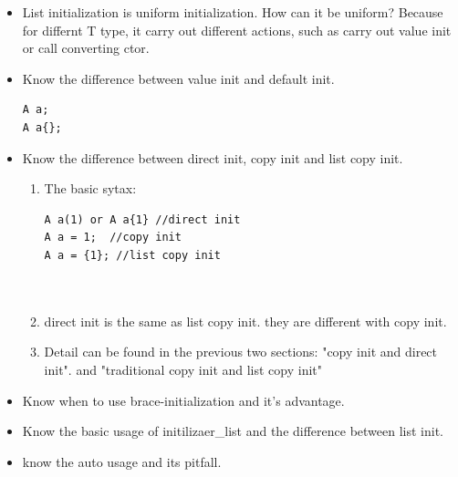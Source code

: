 \documentclass[a4paper,11pt,twoside]{book}
\begin{document}
\begin{itemize}
	\item List initialization is uniform initialization. How can it be uniform? Because for differnt T type, it carry out different actions, such as carry out value init or call converting ctor.

	\item Know the difference between value init and default init. 
\begin{lstlisting}
A a;
A a{};
\end{lstlisting}	 

	\item Know the difference between direct init, copy init and list copy init. 
	\begin{enumerate}
		\item The basic sytax:
\begin{lstlisting}
A a(1) or A a{1} //direct init
A a = 1;  //copy init
A a = {1}; //list copy init	
		  
			
\end{lstlisting}	 
		\item direct init is the same as list copy init. they are different with copy init.
		\item Detail can be found in the previous two sections: "copy init and direct init". and "traditional copy init and list copy init"
		
	\end{enumerate}
  
																				
  
																																																																																											   
				  
	
	\item Know when to use brace-initialization and it's advantage.
	
	\item Know the basic usage of initilizaer\_list and the difference between list init.
	
	\item know the auto usage and its pitfall.
			 


								   
			   
 
																																									  
	
																																						
 
																																															  
 
																																										   

\end{itemize}
\end{document}
